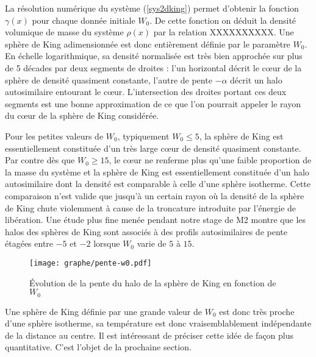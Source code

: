 	La résolution numérique du système (\ref{sys2dking}) permet d'obtenir la fonction $\gamma(x)$ pour chaque donnée initiale $W_0$. De cette fonction on déduit la densité volumique de masse du système $\rho(x)$ par la relation XXXXXXXXXX. Une sphère de King adimensionnée est donc entièrement définie par le paramètre $W_0$. En échelle logarithmique, sa densité normalisée est très bien approchée sur plus de 5 décades par deux segments de droites : l'un horizontal décrit le c\oe ur de la sphère de densité quasiment constante, l'autre de pente $-\alpha$ décrit un halo autosimilaire entourant le c\oe ur. L'intersection des droites portant ces deux segments est une bonne approximation de ce que l'on pourrait appeler le rayon du c\oe ur de la sphère de King considérée.
		
	Pour les petites valeurs de $W_0$, typiquement $W_0\leq 5$, la sphère de King est essentiellement constituée d'un très large c\oe ur de densité quasiment constante. Par contre dès que  $W_0\geq 15$, le c\oe ur ne renferme plus qu'une faible proportion de la masse du système et la sphère de King est essentiellement constituée d'un halo autosimilaire dont la densité est comparable à celle d'une sphère isotherme. Cette comparaison n'est valide que jusqu’à un certain rayon où la densité de la sphère de King chute violemment  à cause de la troncature introduite par l'énergie de libération.
	Une étude plus fine menée pendant notre stage de M2 montre que les halos des sphères de King sont associés à des profils autosimilaires de pente étagées entre $-5$  et $-2$ lorsque $W_0$ varie de $5$ à $15$.
	
	\begin{figure}[hbt!]
		\centering \texttt{[image: graphe/pente-w0.pdf]}%
		\caption{Évolution de la pente du halo de la sphère de King en fonction de $W_0$}
		\label{coeff_evo}
	\end{figure}
	
	Une sphère de King définie par une grande valeur de $W_0$ est donc très proche d'une sphère isotherme, sa température est donc vraisemblablement indépendante de la distance au centre. Il est intéressant de préciser cette idée de façon plus quantitative. C'est l'objet de la prochaine section.
	
	\FloatBarrier
